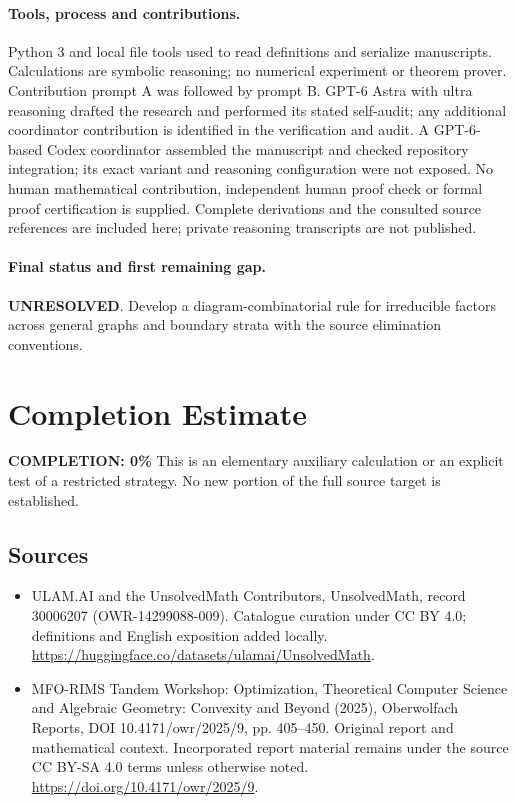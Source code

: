 \documentclass[11pt]{article}
\begin{document}
\paragraph{Tools, process and contributions.}
Python 3 and local file tools used to read definitions and serialize manuscripts. Calculations are symbolic reasoning; no numerical experiment or theorem prover. Contribution prompt A was followed by prompt B. GPT-6 Astra with ultra reasoning drafted the research and performed its stated self-audit; any additional coordinator contribution is identified in the verification and audit. A GPT-6-based Codex coordinator assembled the manuscript and checked repository integration; its exact variant and reasoning configuration were not exposed. No human mathematical contribution, independent human proof check or formal proof certification is supplied. Complete derivations and the consulted source references are included here; private reasoning transcripts are not published.

\paragraph{Final status and first remaining gap.}
\textbf{UNRESOLVED}. Develop a diagram-combinatorial rule for irreducible factors across general graphs and boundary strata with the source elimination conventions.

\section{Completion Estimate}
\noindent\textbf{COMPLETION: 0\%}
This is an elementary auxiliary calculation or an explicit test of a restricted strategy. No new portion of the full source target is established.

\subsection{Sources}
\begin{itemize}
\item[\hypertarget{source:30006207:1}{S1}] ULAM.AI and the UnsolvedMath Contributors, UnsolvedMath, record 30006207 (OWR-14299088-009). Catalogue curation under CC BY 4.0; definitions and English exposition added locally.
\url{https://huggingface.co/datasets/ulamai/UnsolvedMath}.
\item[\hypertarget{source:30006207:2}{S2}] MFO-RIMS Tandem Workshop: Optimization, Theoretical Computer Science and Algebraic Geometry: Convexity and Beyond (2025), Oberwolfach Reports, DOI 10.4171/owr/2025/9, pp. 405--450. Original report and mathematical context. Incorporated report material remains under the source CC BY-SA 4.0 terms unless otherwise noted.
\url{https://doi.org/10.4171/owr/2025/9}.
\end{itemize}
\label{end:30006207}
\end{document}
